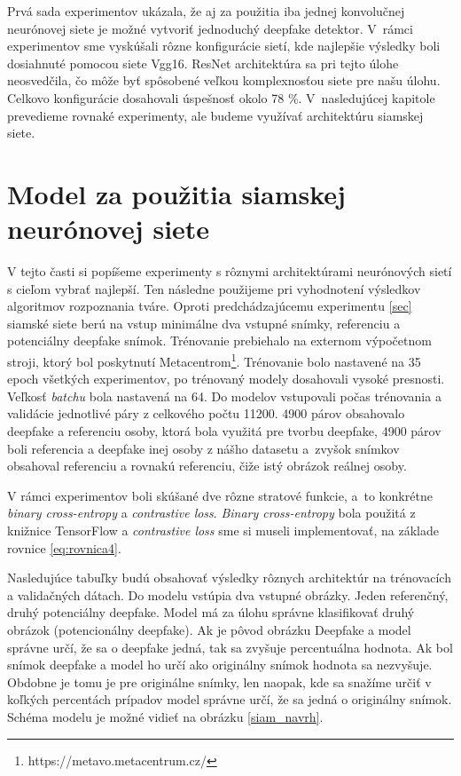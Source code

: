 Prvá sada experimentov ukázala, že aj za použitia iba jednej konvolučnej neurónovej siete je možné vytvoriť jednoduchý deepfake detektor. V~rámci experimentov sme vyskúšali rôzne konfigurácie sietí, kde najlepšie výsledky boli dosiahnuté pomocou siete Vgg16. ResNet architektúra sa pri tejto úlohe neosvedčila, čo môže byť spôsobené veľkou komplexnosťou siete pre našu úlohu. Celkovo konfigurácie dosahovali úspešnosť okolo 78 \%. V~nasledujúcej kapitole prevedieme rovnaké experimenty, ale budeme využívať architektúru siamskej siete.

\section{Model za použitia siamskej neurónovej siete}
V tejto časti si popíšeme experimenty s rôznymi architektúrami neurónových sietí s cieľom vybrať najlepší. Ten následne použijeme pri vyhodnotení výsledkov algoritmov rozpoznania tváre. Oproti predchádzajúcemu experimentu \ref{sec} siamské siete berú na vstup minimálne dva vstupné snímky, referenciu a potenciálny deepfake snímok. Trénovanie prebiehalo na externom výpočetnom stroji, ktorý bol poskytnutí Metacentrom\footnote{https://metavo.metacentrum.cz/}. Trénovanie bolo nastavené na 35 epoch všetkých experimentov, po trénovaný modely dosahovali vysoké presnosti. Veľkosť \textit{batchu} bola nastavená na 64. Do modelov vstupovali počas trénovania a validácie jednotlivé páry z celkového počtu 11200. 4900 párov obsahovalo deepfake a referenciu osoby, ktorá bola využitá pre tvorbu deepfake, 4900 párov boli referencia a deepfake inej osoby z nášho datasetu a~zvyšok snímkov obsahoval referenciu a rovnakú referenciu, čiže istý obrázok reálnej osoby.

V rámci experimentov boli skúšané dve rôzne stratové funkcie, a~to konkrétne \textit{binary cross-entropy} a \textit{contrastive loss}. \textit{Binary cross-entropy} bola použitá z knižnice TensorFlow a \textit{contrastive loss} sme si museli implementovať, na základe rovnice \ref{eq:rovnica4}.

Nasledujúce tabuľky budú obsahovať výsledky rôznych architektúr na trénovacích a validačných dátach. Do modelu vstúpia dva vstupné obrázky. Jeden referenčný, druhý potenciálny deepfake. Model má za úlohu správne klasifikovať druhý obrázok (potencionálny deepfake). Ak je pôvod obrázku Deepfake a model správne určí, že sa o deepfake jedná, tak sa zvyšuje percentuálna hodnota. Ak bol snímok deepfake a model ho určí ako originálny snímok hodnota sa nezvyšuje. Obdobne je tomu je pre originálne snímky, len naopak, kde sa snažíme určiť v koľkých percentách prípadov model správne určí, že sa jedná o originálny snímok. Schéma modelu je možné vidieť na obrázku \ref{siam_navrh}.

